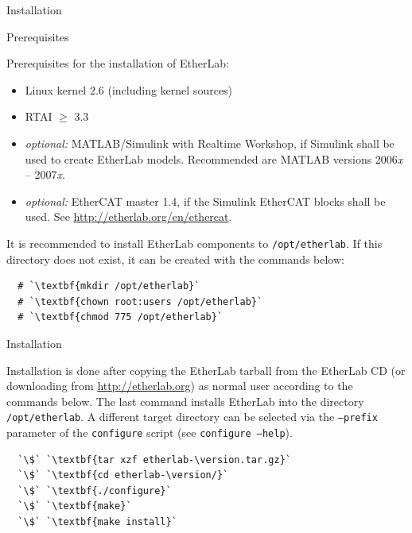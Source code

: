 
\begin{ighsec}{Installation}
\label{sec:install}

\begin{ighsec}{Prerequisites}

Prerequisites for the installation of EtherLab:

\begin{itemize}

\item Linux kernel 2.6 (including kernel sources)

\item RTAI $\ge$ 3.3

\item {\it optional:} MATLAB/Simulink with Realtime Workshop, if Simulink
shall be used to create EtherLab models. Recommended are MATLAB versions
2006{\it x} -- 2007{\it x}.

\item {\it optional:} EtherCAT master 1.4, if the Simulink EtherCAT blocks
shall be used. See \url{http://etherlab.org/en/ethercat}.

\end{itemize}

It is recommended to install EtherLab components to \texttt{/opt/etherlab}. If
this directory does not exist, it can be created with the commands below:

\begin{lstlisting}
  # `\textbf{mkdir /opt/etherlab}`
  # `\textbf{chown root:users /opt/etherlab}`
  # `\textbf{chmod 775 /opt/etherlab}`
\end{lstlisting}

\end{ighsec}

\begin{ighsec}{Installation}
\label{sec:inst-paket}

Installation is done after copying the EtherLab tarball from the EtherLab CD
(or downloading from \url{http://etherlab.org}) as normal user according to
the commands below. The last command installs EtherLab into the directory
\texttt{/opt/etherlab}. A different target directory can be selected via the
\texttt{--prefix} parameter of the \texttt{configure} script (see
\texttt{configure --help}).

\begin{lstlisting}
  `\$` `\textbf{tar xzf etherlab-\version.tar.gz}`
  `\$` `\textbf{cd etherlab-\version/}`
  `\$` `\textbf{./configure}`
  `\$` `\textbf{make}`
  `\$` `\textbf{make install}`
\end{lstlisting}


\end{ighsec}
\end{ighsec}
